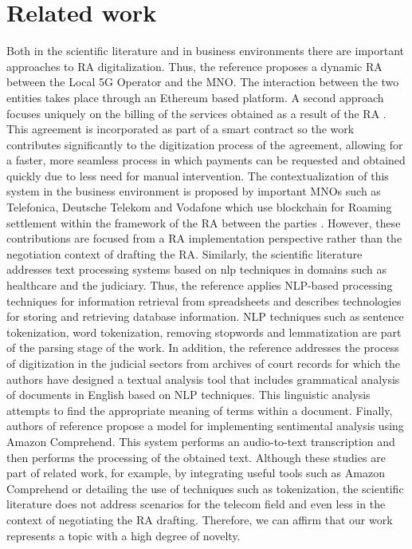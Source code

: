 \documentclass[conference]{style/IEEEtran}
\begin{document}
\section{Related work}

Both in the scientific literature and in business environments there are important approaches to RA digitalization. Thus, the reference \cite{b5} proposes a dynamic RA between the Local 5G Operator and the MNO. The interaction between the two entities takes place through an Ethereum based platform. A second approach focuses uniquely on the billing of the services obtained as a result of the RA \cite{b6}. This agreement is incorporated as part of a smart contract so the work contributes significantly to the digitization process of the agreement, allowing for a faster, more seamless process in which payments can be requested and obtained quickly due to less need for manual intervention. The contextualization of this system in the business environment is proposed by important MNOs such as Telefonica, Deutsche Telekom and Vodafone which use blockchain for Roaming settlement within the framework of the RA between the parties \cite{b7}. However, these contributions are focused from a RA implementation perspective rather than the negotiation context of drafting the RA. Similarly, the scientific literature addresses text processing systems based on nlp techniques in domains such as healthcare and the judiciary. Thus, the reference \cite{b8} applies NLP-based processing techniques for information retrieval from spreadsheets and describes technologies for storing and retrieving database information. NLP techniques such as sentence tokenization, word tokenization, removing stopwords and lemmatization are part of the parsing stage of the work. In addition, the reference \cite{b9} addresses the process of digitization in the judicial sectors from archives of court records for which the authors have designed a textual analysis tool that includes grammatical analysis of documents in English based on NLP techniques. This linguistic analysis attempts to find the appropriate meaning of terms within a document. Finally, authors of reference \cite{b10} propose a model for implementing sentimental analysis using Amazon Comprehend. This system performs an audio-to-text transcription and then performs the processing of the obtained text. Although these studies are part of related work, for example, by integrating useful tools such as Amazon Comprehend or detailing the use of techniques such as tokenization, the scientific literature does not address scenarios for the telecom field and even less in the context of negotiating the RA drafting. Therefore, we can affirm that our work represents a topic with a high degree of novelty.
\end{document}
